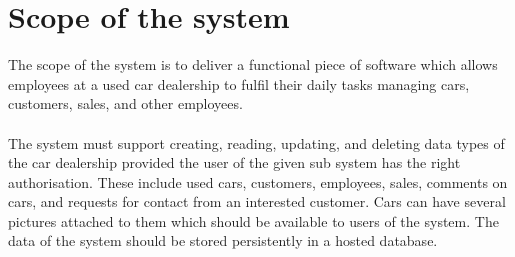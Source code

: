 \section{Scope of the system}
The scope of the system is to deliver a functional piece of software which allows employees at a used car dealership to fulfil their daily tasks managing cars, customers, sales, and other employees.\\\\
The system must support creating, reading, updating, and deleting data types of the car dealership provided the user of the given sub system has the right authorisation.
These include used cars, customers, employees, sales, comments on cars, and requests for contact from an interested customer. 
Cars can have several pictures attached to them which should be available to users of the system. 
The data of the system should be stored persistently in a hosted database. 